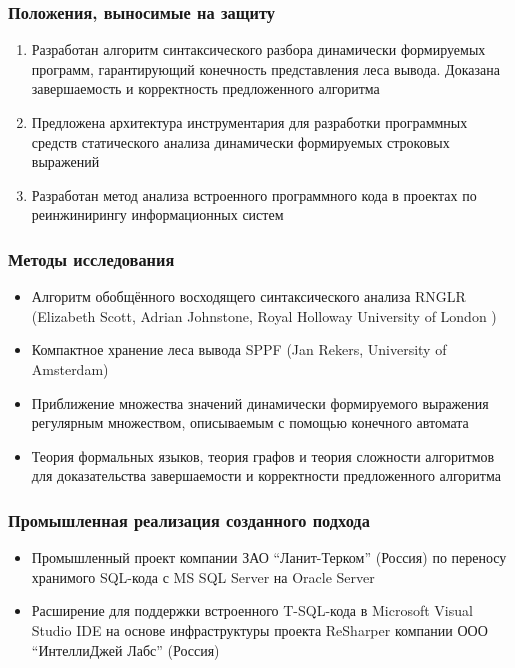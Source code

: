 \documentclass{beamer}
\begin{document}
\begin{frame}
    \transwipe[direction=90]
    \frametitle{Положения, выносимые на защиту}
    \begin{enumerate}
        \item Разработан алгоритм синтаксического разбора динамически формируемых программ, гарантирующий конечность представления леса вывода. Доказана завершаемость и корректность предложенного алгоритма
        \item Предложена архитектура инструментария для разработки программных средств статического анализа динамически формируемых строковых выражений
        \item Разработан метод анализа встроенного программного кода в проектах по реинжинирингу информационных систем
    \end{enumerate}
\end{frame}

\begin{frame}
    \transwipe[direction=90]
    \frametitle{Методы исследования}
        \begin{itemize}
            \item Алгоритм обобщённого восходящего синтаксического анализа RNGLR (Elizabeth Scott, Adrian Johnstone, Royal Holloway University of London )
            \item Компактное хранение леса вывода SPPF (Jan Rekers, University of Amsterdam)
            \item Приближение множества значений динамически формируемого выражения регулярным множеством, описываемым с помощью конечного автомата
            \item Теория формальных языков, теория графов и теория сложности алгоритмов для доказательства завершаемости и корректности предложенного алгоритма            
        \end{itemize}
\end{frame}

\begin{frame}
    \transwipe[direction=90]
    \frametitle{Промышленная реализация созданного подхода}
        \begin{itemize}
            \item Промышленный проект компании ЗАО “Ланит-Терком” (Россия) по переносу хранимого SQL-кода с MS SQL Server на Oracle Server
            \item Расширение для поддержки встроенного T-SQL-кода в Microsoft Visual Studio IDE на основе инфраструктуры проекта ReSharper компании ООО “ИнтеллиДжей Лабс” (Россия)
        \end{itemize}
\end{frame}
\end{document}

